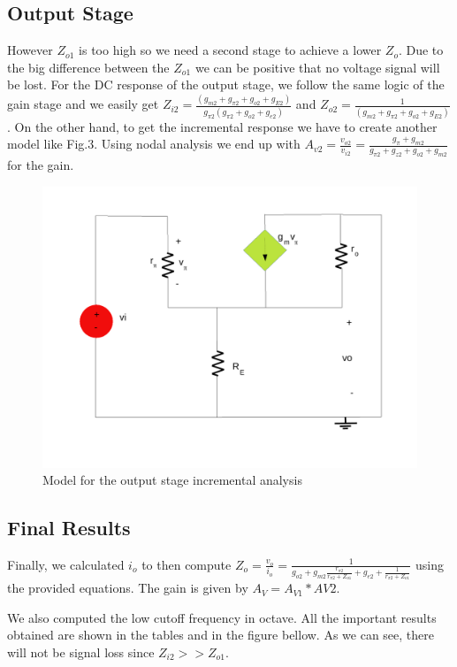 \subsection{Output Stage}

However $Z_{o1}$ is too high so we need a second stage to achieve a lower $Z_{o}$. Due to the big difference between the $Z_{o1}$ we can be positive that no voltage signal will be lost.
For the DC response of the output stage, we follow the same logic of the gain stage and we easily get $Z_{i2}=\frac{(g_{m2}+g_{\pi 2}+g_{o2}+g_{E2})}{g_{\pi 2}(g_{\pi 2}+g_{o2}+g_{e2})}$ and $Z_{o2}= \frac{1}{(g_{m2}+g_{\pi2}+g_{o2}+g_{E2})}$. On the other hand, to get the incremental response we have to create another model like Fig.3. Using nodal analysis we end up with $A_{v2} = \frac{v_{o2}}{v_{i2}} = \frac{g_{\pi} + g_{m2} }{g_{\pi 2}+g_{z2}+g_{o2}+g_{m2}}$ for the gain.



\begin{figure}[h] \centering
\includegraphics[width=0.65\linewidth]{lab41.pdf}
\caption{Model for the output stage incremental analysis}
\label{s}
\end{figure}


\subsection{Final Results}


Finally, we calculated $i_o$ to then compute $Z_o=\frac{v_{o}}{i_o}=\frac{1}{g_{o2}+g_{m2}\frac{r_{\pi 2}}{r_{\pi 2}+Z_{o1}}+g_{e2}+\frac{1}{r_{\pi 2}+Z_{o1}}}$ using the provided equations. The gain is given by $A_V = A_{V1}*{AV2}$.

We also computed the low cutoff frequency in octave.
All the important results obtained are shown in the tables and in the figure bellow. As we can see, there will not be signal loss since $Z_{i2}>>Z_{o1}$.


